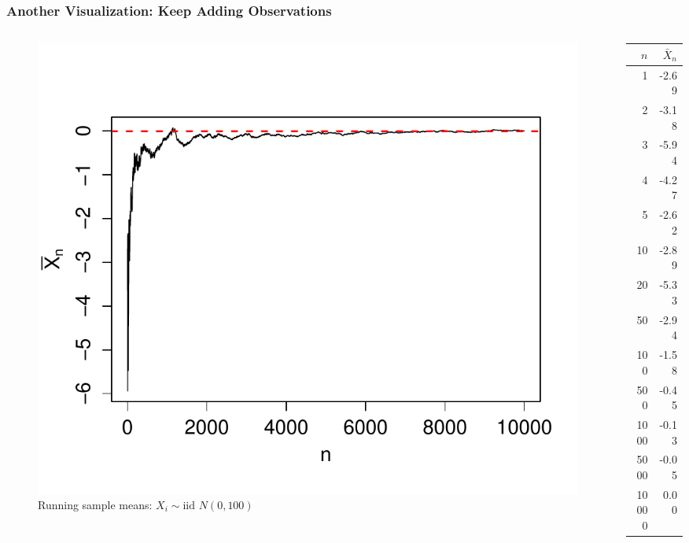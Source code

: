 \begin{frame}
\frametitle{Another Visualization: Keep Adding Observations}
\begin{columns} 
\begin{column}[c]{8cm} 
\begin{figure}
\centering
\includegraphics[scale = 0.5]{./images/WLLN}
\caption{Running sample means: $X_i \sim \mbox{iid } N(0, 100)$}
\end{figure}
\end{column} 
\begin{column}[c]{3cm} 

\footnotesize
\begin{table}
\begin{tabular}{|rr|}
\hline
$n$&$\bar{X}_n$\\
\hline
1 &-2.69\\
2 &-3.18\\
3 &-5.94\\
4 &-4.27\\
5 &-2.62\\
10& -2.89\\
20& -5.33\\
50 &-2.94\\
100& -1.58\\
500 &-0.45\\
1000& -0.13\\
5000& -0.05\\
10000&  0.00\\
\hline
\end{tabular}
\end{table}

\end{column} 
\end{columns} 


\end{frame}
